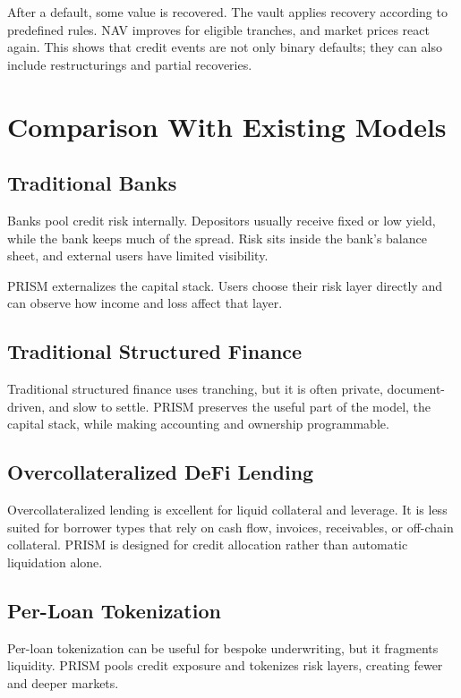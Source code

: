 \documentclass[11pt]{article}
\begin{document}
After a default, some value is recovered. The vault applies recovery according
to predefined rules. NAV improves for eligible tranches, and market prices react
again. This shows that credit events are not only binary defaults; they can also
include restructurings and partial recoveries.

\section{Comparison With Existing Models}

\subsection{Traditional Banks}

Banks pool credit risk internally. Depositors usually receive fixed or low
yield, while the bank keeps much of the spread. Risk sits inside the bank's
balance sheet, and external users have limited visibility.

PRISM externalizes the capital stack. Users choose their risk layer directly and
can observe how income and loss affect that layer.

\subsection{Traditional Structured Finance}

Traditional structured finance uses tranching, but it is often private,
document-driven, and slow to settle. PRISM preserves the useful part of the
model, the capital stack, while making accounting and ownership programmable.

\subsection{Overcollateralized DeFi Lending}

Overcollateralized lending is excellent for liquid collateral and leverage. It
is less suited for borrower types that rely on cash flow, invoices, receivables,
or off-chain collateral. PRISM is designed for credit allocation rather than
automatic liquidation alone.

\subsection{Per-Loan Tokenization}

Per-loan tokenization can be useful for bespoke underwriting, but it fragments
liquidity. PRISM pools credit exposure and tokenizes risk layers, creating fewer
and deeper markets.
\end{document}
